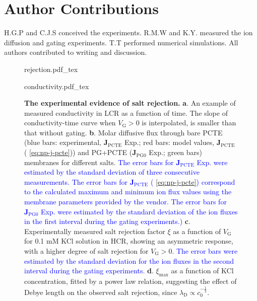 
\section{Author Contributions}
\label{sec:np-np-author-contrib}

H.G.P and C.J.S conceived the experiments. R.M.W and K.Y. measured the ion
diffusion and gating experiments. T.T performed numerical
simulations. All authors contributed to writing and discussion.




\begin{figure}[!htbp]
  {rejection.pdf_tex}
\end{figure}

\begin{figure}[H]
  \centering
   {conductivity.pdf_tex}
  \caption{ \textbf{The experimental evidence of salt rejection.}
    \textbf{a}. An example of measured conductivity in LCR as a
    function of time. The slope of conductivity-time curve when
    $V_{\mathrm{G}}>0$ is interpolated, is smaller than that without
    gating. \textbf{b}. Molar diffusive flux through bare PCTE (blue
    bars: experimental, $\symbf{J}_{\mathrm{PCTE}}$ Exp.; red
    bars: model values, $\symbf{J}_{\mathrm{PCTE}}$
    ( \autoref{eq:np-j-pcte})) and PG+PCTE
    ($\symbf{J}_{\mathrm{PG0}}$ Exp.; green bars) membranes for
    different salts. \textcolor{blue}{The error bars for
      $\symbf{J}_{\mathrm{PCTE}}$ Exp. were estimated by the
      standard deviation of three consecutive measurements. The error bars
      for $\symbf{J}_{\mathrm{PCTE}}$ ( \autoref{eq:np-j-pcte})
      correspond to the calculated maximum and minimum ion flux values
      using the membrane parameters provided by the vendor. The error
      bars for $\symbf{J}_{\mathrm{PG0}}$ Exp. were estimated by
      the standard deviation of the ion fluxes in the first interval
      during the gating experiments.)}  \textbf{c}. Experimentally
    measured salt rejection factor $\xi$ as a function of
    $V_{\mathrm{G}}$ for 0.1 mM KCl solution in HCR, showing an
    asymmetric response, with a higher degree of salt rejection for
    $V_{\mathrm{G}}>0$. \textcolor{blue}{The error bars were estimated
      by the standard deviation for the ion fluxes in the second
      interval during the gating experiments.}
    \textbf{d}. $\xi_{\mathrm{max}}$ as a function of KCl
    concentration, fitted by a power law relation, suggesting the
    effect of Debye length on the observed salt rejection, since
    $\lambda_{\mathrm{D}} \propto c_{0}^{-\frac{1}{2}}$.}
  \label{fig:np-2} 
\end{figure}

